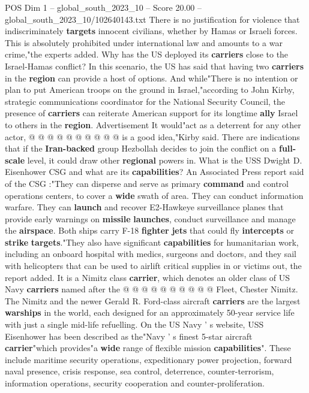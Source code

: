 \begin{textsample}{POS Dim 1 – global\_south\_2023\_10 – Score 20.00 – global\_south\_2023\_10/102640143.txt}
There is no justification for violence that indiscriminately \textbf{targets} innocent civilians, whether by Hamas or Israeli forces.
This is absolutely prohibited under international law and amounts to a war crime,"the experts added.
Why has the US deployed its \textbf{carriers} close to the Israel-Hamas conflict?
In this scenario, the US has said that having two \textbf{carriers} in the \textbf{region} can provide a host of options.
And while"There is no intention or plan to put American troops on the ground in Israel,"according to John Kirby, strategic communications coordinator for the National Security Council, the presence of \textbf{carriers} can reiterate American support for its longtime \textbf{ally} Israel to others in the \textbf{region}.
Advertisement It would"act as a deterrent for any other actor, @ @ @ @ @ @ @ @ @ @ is a good idea,"Kirby said.
There are indications that if the \textbf{Iran-backed} group Hezbollah decides to join the conflict on a \textbf{full-scale} level, it could draw other \textbf{regional} powers in.
What is the USS Dwight D.
Eisenhower CSG and what are its \textbf{capabilities}?
An Associated Press report said of the CSG :"They can disperse and serve as primary \textbf{command} and control operations centers, to cover a \textbf{wide} swath of area.
They can conduct information warfare.
They can \textbf{launch} and recover E2-Hawkeye surveillance planes that provide early warnings on \textbf{missile} \textbf{launches}, conduct surveillance and manage the \textbf{airspace}.
Both ships carry F-18 \textbf{fighter} \textbf{jets} that could fly \textbf{intercepts} or \textbf{strike} \textbf{targets}."They also have significant \textbf{capabilities} for humanitarian work, including an onboard hospital with medics, surgeons and doctors, and they sail with helicopters that can be used to airlift critical supplies in or victims out, the report added.
It is a Nimitz class \textbf{carrier}, which denotes an older class of US Navy \textbf{carriers} named after the @ @ @ @ @ @ @ @ @ @ Fleet, Chester Nimitz.
The Nimitz and the newer Gerald R.
Ford-class aircraft \textbf{carriers} are the largest \textbf{warships} in the world, each designed for an approximately 50-year service life with just a single mid-life refuelling.
On the US Navy ' s website, USS Eisenhower has been described as the"Navy ' s finest 5-star aircraft \textbf{carrier}"which provides"a \textbf{wide} range of flexible mission \textbf{capabilities}".
These include maritime security operations, expeditionary power projection, forward naval presence, crisis response, sea control, deterrence, counter-terrorism, information operations, security cooperation and counter-proliferation.

\end{textsample}
